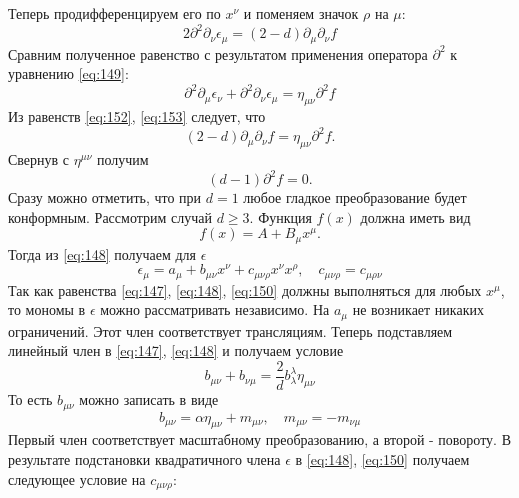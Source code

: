 \documentclass[a4paper,12pt]{article}
\theoremstyle{definition}
\theoremstyle{definition}
\theoremstyle{definition}
\begin{document}
Теперь продифференцируем его по $x^{\nu}$ и поменяем значок $\rho$ на $\mu$:
\begin{equation}
  \label{eq:152}
  2\partial^2 \partial_{\nu} \epsilon_{\mu}=(2-d)\partial_{\mu}\partial_{\nu} f
\end{equation}
Сравним полученное равенство с результатом применения оператора $\partial^2$ к уравнению \eqref{eq:149}:
\begin{equation}
  \label{eq:153}
  \partial^2 \partial_{\mu}\epsilon_{\nu}+\partial^2 \partial_{\nu}\epsilon_{\mu}=\eta_{\mu\nu}\partial^2 f
\end{equation}
Из равенств \eqref{eq:152}, \eqref{eq:153} следует, что
\begin{equation}
  \label{eq:154}
  (2-d)\partial_{\mu}\partial_{\nu}f=\eta_{\mu\nu}\partial^2 f.
\end{equation}
Свернув с $\eta^{\mu\nu}$ получим
\begin{equation}
  \label{eq:155}
  (d-1)\partial^2 f =0.
\end{equation}
Сразу можно отметить, что при $d=1$ любое гладкое преобразование будет конформным. Рассмотрим случай $d\geq 3$. Функция $f(x)$ должна иметь вид
\begin{equation}
  \label{eq:156}
  f(x)=A+B_{\mu}x^{\mu}.
\end{equation}
Тогда из \eqref{eq:148} получаем для $\epsilon$
\begin{equation}
  \label{eq:157}
  \epsilon_{\mu}=a_{\mu}+b_{\mu\nu}x^{\nu} +c_{\mu\nu\rho}x^{\nu}x^{\rho},\quad c_{\mu\nu\rho}=c_{\mu\rho\nu}
\end{equation}
Так как равенства \eqref{eq:147}, \eqref{eq:148}, \eqref{eq:150} должны выполняться для любых $x^{\mu}$, то мономы в $\epsilon$ можно рассматривать независимо. На $a_{\mu}$ не возникает никаких ограничений. Этот член соответствует трансляциям. Теперь подставляем линейный член в \eqref{eq:147}, \eqref{eq:148} и получаем условие
\begin{equation}
  \label{eq:158}
  b_{\mu\nu}+b_{\nu\mu}=\frac{2}{d}b^{\lambda}_{\lambda}\eta_{\mu\nu}
\end{equation}
То есть $b_{\mu\nu}$ можно записать в виде
\begin{equation}
  \label{eq:159}
  b_{\mu\nu}=\alpha \eta_{\mu\nu} +m_{\mu\nu},\quad m_{\mu\nu}=-m_{\nu\mu}
\end{equation}
Первый член соответствует масштабному преобразованию, а второй - повороту. 
В результате подстановки квадратичного члена $\epsilon$ в \eqref{eq:148}, \eqref{eq:150} получаем следующее условие на $c_{\mu\nu\rho}$:
\end{document}

